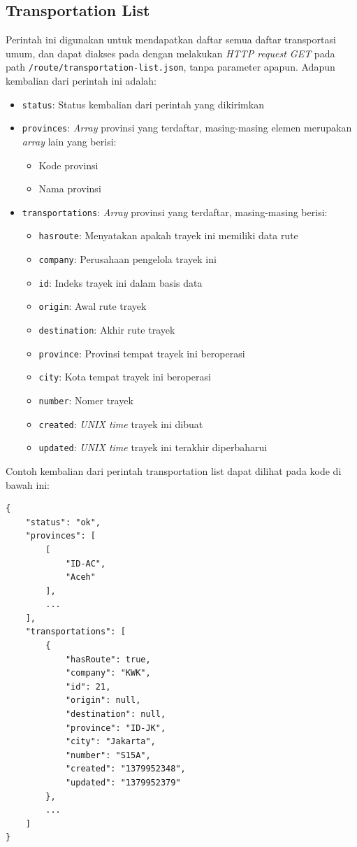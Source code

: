 \subsection{Transportation List}
Perintah ini digunakan untuk mendapatkan daftar semua daftar transportasi umum, dan dapat diakses pada dengan melakukan \textit{HTTP request GET} pada path \verb|/route/transportation-list.json|, tanpa parameter apapun. Adapun kembalian dari perintah ini adalah:

\begin{itemize}
	\item \verb/status/: Status kembalian dari perintah yang dikirimkan
	\item \verb/provinces/: \textit{Array} provinsi yang terdaftar, masing-masing elemen merupakan \textit{array} lain yang berisi:
		\begin{itemize}
			\item Kode provinsi
			\item Nama provinsi
		\end{itemize}
	\item \verb/transportations/: \textit{Array} provinsi yang terdaftar, masing-masing berisi:
		\begin{itemize}
			\item \verb/hasroute/: Menyatakan apakah trayek ini memiliki data rute
			\item \verb/company/: Perusahaan pengelola trayek ini
			\item \verb/id/: Indeks trayek ini dalam basis data
			\item \verb/origin/: Awal rute trayek
			\item \verb/destination/: Akhir rute trayek
			\item \verb/province/: Provinsi tempat trayek ini beroperasi
			\item \verb/city/: Kota tempat trayek ini beroperasi
			\item \verb/number/: Nomer trayek
			\item \verb/created/: \textit{UNIX time} trayek ini dibuat
			\item \verb/updated/: \textit{UNIX time} trayek ini terakhir diperbaharui
		\end{itemize}
\end{itemize}

Contoh kembalian dari perintah transportation list dapat dilihat pada kode di bawah ini:

\begin{lstlisting}
{
	"status": "ok",
	"provinces": [
		[
			"ID-AC",
			"Aceh"
		],
		...
	],
	"transportations": [
		{
			"hasRoute": true,
			"company": "KWK",
			"id": 21,
			"origin": null,
			"destination": null,
			"province": "ID-JK",
			"city": "Jakarta",
			"number": "S15A",
			"created": "1379952348",
			"updated": "1379952379"
		},
		...
	]
}
\end{lstlisting}

